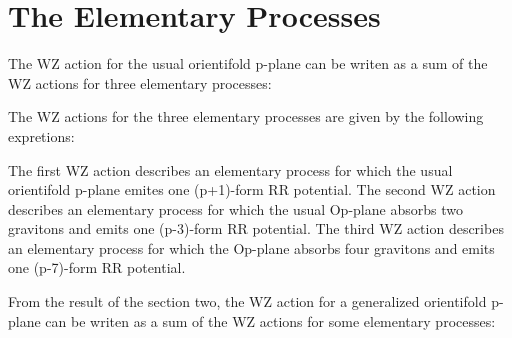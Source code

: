 \documentclass[a4paper,a4paper]{article}
\begin{document}
\section{The Elementary Processes}
The WZ action for the usual orientifold p-plane can be writen as a sum of the WZ actions for three elementary processes:

\begin{center}
{  \coordHE{} }
\end{center}
The WZ actions for the three elementary processes are given by the following 
expretions:
\begin{center}
{  \coordHE{} }
\end{center} 
\begin{center}
{  \coordHE{} }
\end{center}
\begin{center}
{  \coordHE{} }
\end{center}
The first WZ action describes an elementary process for which the usual orientifold p-plane emites one (p+1)-form RR potential.
The second WZ action describes an elementary process for which the usual
Op-plane absorbs two gravitons and emits one (p-3)-form RR potential.
The third WZ action describes an elementary process for which the Op-plane absorbs four gravitons and emits one (p-7)-form RR potential.
 
From the result of the section two, the WZ action for a generalized orientifold p-plane can be writen as a sum of the WZ actions for some elementary processes:
\begin{center}
{  \coordHE{} }
\end{center}
\end{document}
